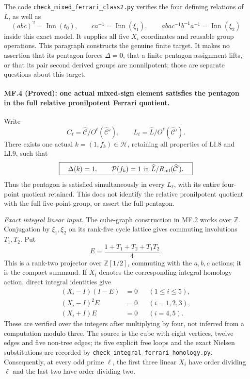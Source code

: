 The code \texttt{check\_mixed\_ferrari\_class2.py} verifies
the four defining relations of $L$, as well as
\[
 (abc)^2=\operatorname{Inn}(t_0),\qquad
 ca^{-1}=\operatorname{Inn}(\xi_1),\qquad
 aba c^{-1}b^{-1}a^{-1}=\operatorname{Inn}(\xi_2)
\]
inside this exact model. It supplies all five $X_i$
coordinates and reusable group operations.
This paragraph constructs the genuine finite target.
It makes no assertion that its pentagon forces $\Delta=0$,
that a finite pentagon assignment lifts, or that its pair
second derived groups are nonnilpotent; those are separate
questions about this target.

\paragraph{MF.4 (Proved): one actual mixed-sign element satisfies the
pentagon in the full relative pronilpotent Ferrari quotient.}
Write
\[
 C_\ell=\widehat{\mathcal C}/O^\ell(\widehat{\mathcal C}'),
 \qquad
 L_\ell=\widehat L/O^\ell(\widehat{\mathcal C}').
\]
There exists one actual $k=(1,f_k)\in\mathcal H$, retaining
all properties of LI.8 and LI.9, such that
\[
 \boxed{\quad\Delta(k)=1,\qquad
 \mathcal P(f_k)=1\ \text{in}\
       \widehat L/R_{\rm nil}(\widehat{\mathcal C}').\quad}
\]
Thus the pentagon is satisfied simultaneously in every
$L_\ell$, with its entire four-point quotient retained.
This does not identify the relative pronilpotent quotient
with the full five-point group, or assert the full pentagon.

\emph{Exact integral linear input.}
The cube-graph construction in MF.2 works over $\mathbb Z$.
Conjugation by $\xi_1,\xi_2$ on its rank-five cycle lattice
gives commuting involutions $T_1,T_2$. Put
\[
 E=\frac{1+T_1+T_2+T_1T_2}{4}.
\]
This is a rank-two projector over $\mathbb Z[1/2]$,
commuting with the $a,b,c$ actions; it is the compact
summand. If $X_i$ denotes the corresponding integral
homology action, direct integral identities give
\[
 \begin{split}
 (X_i-I)(I-E)&=0&& (1\leq i\leq5),\\
 (X_i-I)^2E&=0&& (i=1,2,3),\\
 (X_i+I)E&=0&& (i=4,5).
 \end{split}
\]
These are verified over the integers after multiplying
by four, not inferred from a computation modulo three.
The source is the cube with eight vertices, twelve edges
and five non-tree edges; its five explicit free loops and
the exact Nielsen substitutions are recorded by
\texttt{check\_integral\_ferrari\_homology.py}.
Consequently, at every odd prime $\ell$, the first three
linear $X_i$ have order dividing $\ell$ and the last two
have order dividing two.

